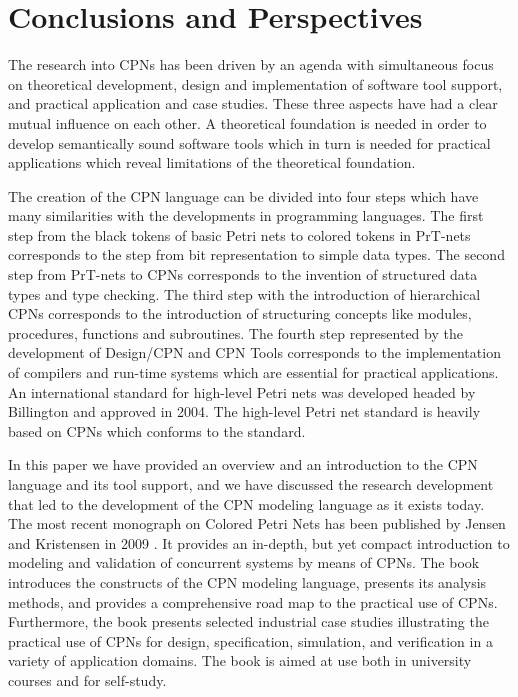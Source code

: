 \section{Conclusions and Perspectives}

The research into CPNs has been driven by an agenda with
simultaneous focus on theoretical development, design and
implementation of software tool support, and practical application and
case studies. These three aspects have had a clear mutual influence on
each other. A theoretical foundation is needed in order to develop
semantically sound software tools which in turn is needed for
practical applications which reveal limitations of the theoretical
foundation.



The creation of the CPN language can be divided into four steps which
have many similarities with the developments in programming
languages. The first step from the black tokens of basic Petri nets to
colored tokens in PrT-nets corresponds to the step from bit
representation to simple data types. The second step from PrT-nets to
CPNs corresponds to the invention of structured data types and type
checking. The third step with the introduction of hierarchical CPNs
corresponds to the introduction of structuring concepts like modules,
procedures, functions and subroutines. The fourth step represented by
the development of Design/CPN and CPN Tools corresponds to the
implementation of compilers and run-time systems which are essential
for practical applications. An international standard for high-level
Petri nets was developed headed by Billington \cite{hcpnstandard} and
approved in 2004. The high-level Petri net standard is heavily based
on CPNs which conforms to the standard.


In this paper we have provided an overview and an introduction to the
CPN language and its tool support, and we have discussed the research
development that led to the development of the CPN modeling language
as it exists today. The most recent monograph on Colored Petri Nets
has been published by Jensen and Kristensen in 2009
\cite{newcpnbook}. It provides an in-depth, but yet compact
introduction to modeling and validation of concurrent systems by means
of CPNs. The book introduces the constructs of the CPN modeling
language, presents its analysis methods, and provides a comprehensive
road map to the practical use of CPNs. Furthermore, the book presents
selected industrial case studies illustrating the practical use of
CPNs for design, specification, simulation, and verification in a
variety of application domains. The book is aimed at use both in
university courses and for self-study.

